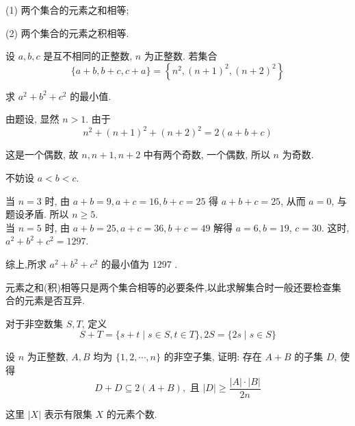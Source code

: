 (1) 两个集合的元素之和相等;

(2) 两个集合的元素之积相等.
\begin{example}
	设 $a ,  b ,  c$ 是互不相同的正整数, $n$ 为正整数. 若集合
	$$
		\{a+b, b+c, c+a\}=\left\{n^{2},(n+1)^{2},(n+2)^{2}\right\}
	$$

	求 $a^{2}+b^{2}+c^{2}$ 的最小值.
\end{example}

\begin{solution}
	由题设, 显然 $n>1$. 由于
	$$
		n^{2}+(n+1)^{2}+(n+2)^{2}=2(a+b+c)
	$$

	这是一个偶数, 故 $n ,  n+1 ,  n+2$ 中有两个奇数, 一个偶数, 所以 $n$ 为奇数.

	不妨设 $a<b<c$.

	当 $n=3$ 时, 由 $a+b=9, a+c=16, b+c=25$ 得 $a+b+c=25$, 从而 $a=0$, 与题设矛盾. 所以 $n \geqslant 5$.\\
	当 $n=5$ 时, 由 $a+b=25, a+c=36, b+c=49$ 解得 $a=6, b=19$, $c=30$. 这时, $a^{2}+b^{2}+c^{2}=1297$.

	综上,所求 $a^{2}+b^{2}+c^{2}$ 的最小值为 1297 .
\end{solution}

\begin{note}
	元素之和(积)相等只是两个集合相等的必要条件,以此求解集合时一般还要检查集合的元素是否互异.
\end{note}

\begin{example}\label{ex:6}
	对于非空数集 $S ,  T$, 定义
	$$
		S+T=\{s+t \mid s \in S, t \in T\}, 2 S=\{2 s \mid s \in S\}
	$$

	设 $n$ 为正整数, $A ,  B$ 均为 $\{1,2, \cdots, n\}$ 的非空子集, 证明: 存在 $A+B$ 的子集 $D$, 使得
	$$
		D+D \subseteq 2(A+B), \text { 且 }|D| \geqslant \frac{|A| \cdot|B|}{2 n}
	$$

	这里 $|X|$ 表示有限集 $X$ 的元素个数.
\end{example}

